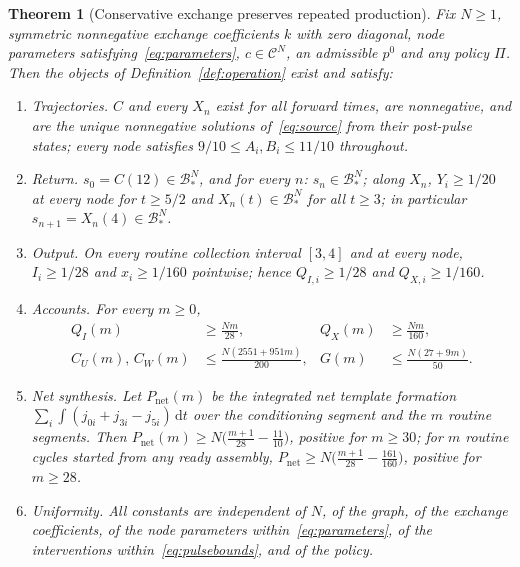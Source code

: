 \documentclass[11pt,a4paper]{article}
\theoremstyle{plain}
\newtheorem{theorem}{Theorem}[section]
\theoremstyle{definition}
\theoremstyle{remark}
\newcommand{\dd}{\,\mathrm d}
\newcommand{\Adm}{\mathcal C}
\newcommand{\Bstar}{\mathcal B_*}
\newcommand{\Iv}{I}
\newcommand{\Pnet}{P_{\mathrm{net}}}
\begin{document}
\begin{theorem}[Conservative exchange preserves repeated production]\label{thm:main}
Fix $N\ge1$, symmetric nonnegative exchange coefficients $k$ with zero diagonal, node parameters satisfying~\eqref{eq:parameters}, $c\in\Adm^N$, an admissible $p^0$ and any policy $\Pi$. Then the objects of Definition~\ref{def:operation} exist and satisfy:
\begin{enumerate}[label=(\alph*),leftmargin=2.2em]
\item\label{it:traj} \emph{Trajectories.} $C$ and every $X_n$ exist for all forward times, are nonnegative, and are the unique nonnegative solutions of~\eqref{eq:source} from their post-pulse states; every node satisfies $9/10\le A_i,B_i\le11/10$ throughout.
\item\label{it:return} \emph{Return.} $s_0=C(12)\in\Bstar^N$, and for every $n$: $s_n\in\Bstar^N$; along $X_n$, $Y_i\ge1/20$ at every node for $t\ge5/2$ and $X_n(t)\in\Bstar^N$ for all $t\ge3$; in particular $s_{n+1}=X_n(4)\in\Bstar^N$.
\item\label{it:output} \emph{Output.} On every routine collection interval $[3,4]$ and at every node, $\Iv_i\ge1/28$ and $x_i\ge1/160$ pointwise; hence $Q_{\Iv,i}\ge1/28$ and $Q_{X,i}\ge1/160$.
\item\label{it:accounts} \emph{Accounts.} For every $m\ge0$,
\begin{equation}\label{eq:accounts}
\begin{aligned}
Q_\Iv(m)&\ge\frac{Nm}{28},&Q_X(m)&\ge\frac{Nm}{160},\\
C_U(m),\,C_W(m)&\le\frac{N(2551+951m)}{200},&G(m)&\le\frac{N(27+9m)}{50}.
\end{aligned}
\end{equation}
\item\label{it:synthesis} \emph{Net synthesis.} Let $\Pnet(m)$ be the integrated net template formation $\sum_i\int(j_{0i}+j_{3i}-j_{5i})\dd t$ over the conditioning segment and the $m$ routine segments. Then $\Pnet(m)\ge N\bigl(\tfrac{m+1}{28}-\tfrac{11}{10}\bigr)$, positive for $m\ge30$; for $m$ routine cycles started from any ready assembly, $\Pnet\ge N\bigl(\tfrac{m+1}{28}-\tfrac{161}{160}\bigr)$, positive for $m\ge28$.
\item\label{it:uniform} \emph{Uniformity.} All constants are independent of $N$, of the graph, of the exchange coefficients, of the node parameters within~\eqref{eq:parameters}, of the interventions within~\eqref{eq:pulsebounds}, and of the policy.
\end{enumerate}
\end{theorem}
\end{document}
